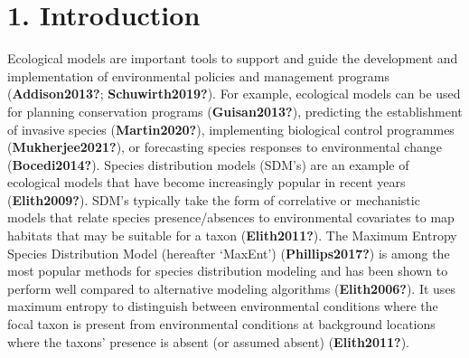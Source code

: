 \documentclass[12pt,]{article}
\begin{document}
\setlength\parindent{24pt}

\hypertarget{introduction}{%
\section{1. Introduction}\label{introduction}}

Ecological models are important tools to support and guide the
development and implementation of environmental policies and management
programs (\textbf{Addison2013?}; \textbf{Schuwirth2019?}). For example,
ecological models can be used for planning conservation programs
(\textbf{Guisan2013?}), predicting the establishment of invasive species
(\textbf{Martin2020?}), implementing biological control programmes
(\textbf{Mukherjee2021?}), or forecasting species responses to
environmental change (\textbf{Bocedi2014?}). Species distribution models
(SDM's) are an example of ecological models that have become
increasingly popular in recent years (\textbf{Elith2009?}). SDM's
typically take the form of correlative or mechanistic models that relate
species presence/absences to environmental covariates to map habitats
that may be suitable for a taxon (\textbf{Elith2011?}). The Maximum
Entropy Species Distribution Model (hereafter `MaxEnt')
(\textbf{Phillips2017?}) is among the most popular methods for species
distribution modeling and has been shown to perform well compared to
alternative modeling algorithms (\textbf{Elith2006?}). It uses maximum
entropy to distinguish between environmental conditions where the focal
taxon is present from environmental conditions at background locations
where the taxons' presence is absent (or assumed absent)
(\textbf{Elith2011?}).
\end{document}
